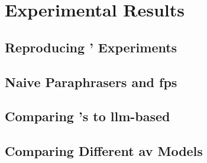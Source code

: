 \chapter{Experimental Results}
\label{chap:experimental_results}

\section{Reproducing \citet{koppel_determining_2014}' Experiments}







\section{Naive Paraphrasers and \acp{fp}}

\section{Comparing \citet{koppel_determining_2014}'s to \ac{llm}-based \imps{}}

\section{Comparing Different \ac{av} Models}